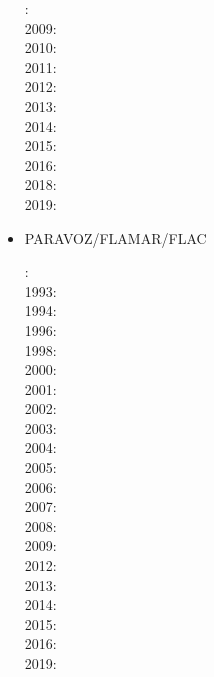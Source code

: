 \begin{itemize}
{\small
{}: \cite{daks08}\cite{scdk08}\\
2009: \cite{gogk09}\\
2010: \cite{krda10}\cite{kaus10}\\
2011: \cite{yakm11}\\
2012: \cite{gebk12}\cite{rukb12}\cite{thka12}\\
2013: \cite{scpo13}\\
2014: \cite{jobk14}\\
2015: \cite{lukz15}\cite{gehm15}\cite{thkp15}\cite{musd15}\\
2016: \cite{jads16}\cite{maka16}\cite{cakp16}\\
2018: \cite{dusd18}\cite{jasc18}\cite{jadg18}\cite{comj18}\cite{jens18}\cite{rabw18}\cite{chsm18}\\
2019: \cite{anpa19}\cite{sifg19}\cite{baba19}\cite{sogh19}
}


\item PARAVOZ/FLAMAR/FLAC 

{\small
{}: \cite{cund89}\cite{hoor89}\\
1993: \cite{pocp93}\cite{zhhj93}\\
1994: \cite{wizh94}\\
1996: \cite{hach96}\cite{zhho96}\\
1998: \cite{gepd98}\\
2000: \cite{labp00}\\
2001: \cite{bujl01}\cite{bupo01}\\
2002: \cite{bast02}\cite{clbb02}\\
2003: \cite{hags03}\cite{gehd03}\cite{upke03}\\
2004: \cite{guhl04}\cite{gewi04}\cite{toba04}\cite{tibb04}\cite{clbm04}\cite{tobj04}\\
2005: \cite{bugu05}\\
2006: \cite{buwa06}\\
2007: \cite{yaab07}\cite{buto07}\cite{chem07}\\
2008: \cite{yaba08}\cite{tibb08}\cite{buya08}\\
2009: \cite{gecm09}\cite{yahb09}\cite{bucl09}\cite{tigv09}\cite{yamb09}\\
2012: \cite{anwb12}\cite{gech12}\cite{gubc12}\cite{gerb12}\\
2013: \cite{wabd13}\cite{frbm13}\cite{tibb13}\\
2014: \cite{frba14}\cite{gagb14}\cite{bufa14}\cite{bufy14b}\\
2015: \cite{wulc15}\cite{gebw15}\cite{svlh15}\\
2016: \cite{marl16}\\
2019: \cite{jala19}
}


\end{itemize}
